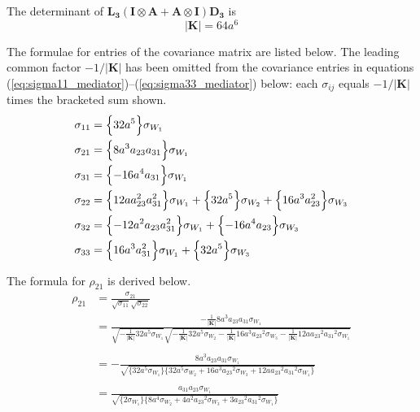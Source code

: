\documentclass{article}
\begin{document}
The determinant of $\mathbf{L_3}(\mathbf{I} \otimes \mathbf{A} + \mathbf{A} \otimes \mathbf{I}) \mathbf{D_3}$ is
\begin{equation}
|\mathbf{K}| = 64a^6
\end{equation}

The formulae for entries of the covariance matrix are listed below.
The leading common factor $-1/|\mathbf{K}|$ has been omitted from the
covariance entries in equations
(\ref{eq:sigma11_mediator})--(\ref{eq:sigma33_mediator}) below: each
$\sigma_{ij}$ equals $-1/|\mathbf{K}|$ times the bracketed sum shown.
\begin{align}
\sigma_{11} &= \Bigl\{ 32a^5 \Bigr\} \sigma_{W_{1}} \label{eq:sigma11_mediator} \\
\sigma_{21} &= \Bigl\{ 8a^3a_{23}a_{31} \Bigr\} \sigma_{W_{1}} \label{eq:sigma21_mediator} \\
\sigma_{31} &= \Bigl\{ -16a^4a_{31} \Bigr\} \sigma_{W_{1}} \label{eq:sigma31_mediator} \\
\sigma_{22} &= \Bigl\{ 12aa_{23}^2a_{31}^2 \Bigr\} \sigma_{W_{1}} + \Bigl\{ 32a^5 \Bigr\} \sigma_{W_{2}} + \Bigl\{ 16a^3a_{23}^2 \Bigr\} \sigma_{W_{3}} \label{eq:sigma22_mediator} \\
\sigma_{32} &= \Bigl\{ -12a^2a_{23}a_{31}^2 \Bigr\} \sigma_{W_{1}} + \Bigl\{ -16a^4a_{23} \Bigr\} \sigma_{W_{3}} \label{eq:sigma32_mediator} \\
\sigma_{33} &= \Bigl\{ 16a^3a_{31}^2 \Bigr\} \sigma_{W_{1}} + \Bigl\{ 32a^5 \Bigr\} \sigma_{W_{3}} \label{eq:sigma33_mediator}
\end{align}

The formula for $\rho_{21}$ is derived below.
\begin{equation}
\begin{aligned}
\rho_{21}&=\frac{\sigma_{21}}{\sqrt{\sigma_{11}} \sqrt{\sigma_{22}}} \\
&=\frac{-\frac{1}{|\mathbf{K}|} 8a^3a_{23}a_{31}\sigma_{W_{1}}} {\sqrt{-\frac{1}{|\mathbf{K}|} 32a^5\sigma_{W_{1}}} \sqrt{-\frac{1}{|\mathbf{K}|} 32a^5\sigma_{W_{2}}-\frac{1}{|\mathbf{K}|}16a^3{a_{23}}^2\sigma_{W_{3}}-\frac{1}{|\mathbf{K}|}12a{a_{23}}^2{a_{31}}^2\sigma_{W_{1}}}} \\
\\
&=-\frac{8a^3a_{23}a_{31}\sigma_{W_{1}}}{\sqrt{\{ 32a^5\sigma_{W_{1}} \} \{  32a^5\sigma_{W_{2}}+ 16a^3{a_{23}}^2\sigma_{W_{3}}+ 12a{a_{23}}^2{a_{31}}^2\sigma_{W_{1}} \} }} \\
\\
&=\frac{ a_{31} a_{23}\sigma_{W_{1}}}{\sqrt{\{ 2\sigma_{W_{1}} \} \{  8a^4\sigma_{W_{2}}+ 4a^2{a_{23}}^2\sigma_{W_{3}}+ 3{a_{23}}^2{a_{31}}^2\sigma_{W_{1}} \} }}
\end{aligned}
\label{eq:rho21_mediator}
\end{equation}
\end{document}
